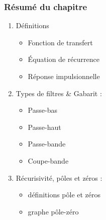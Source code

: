 \documentclass{beamer}
\begin{document}
\begin{frame}
\frametitle{Résumé du chapitre}
\begin{enumerate}
\item Définitions
\begin{itemize}
\item Fonction de transfert 
\vspace{0.1cm}
\item \'Equation de récurrence
\vspace{0.1cm}
\item Réponse impulsionnelle
\vspace{0.1cm}
\end{itemize}
\vspace{0.2cm} 
\item Types de filtres \& Gabarit  :
\begin{itemize}
\item Passe-bas
\vspace{0.1cm}
\item Passe-haut
\vspace{0.1cm}
\item Passe-bande
\vspace{0.1cm}
\item Coupe-bande
\end{itemize}
\vspace{0.2cm} 
\item Récurisivité, pôles et zéros :
\begin{itemize}
\item définitions pôle et zéros
\vspace{0.1cm}
\item graphe pôle-zéro
\end{itemize}
\vspace{0.2cm} 

\end{enumerate}
\end{frame}
\end{document}
